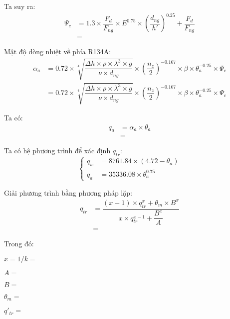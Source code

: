 Ta suy ra:
\begin{equation*}
\begin{split}
		\Psi_{c} &= 1.3\times\dfrac{F_{d}}{F_{ng}}\times E^{0.75}\times\left(\dfrac{d_{ng}}{h'}\right)^{0.25} + \dfrac{F_{d}}{F_{ng}}\\
		&=
\end{split}
\end{equation*}

Mật độ dòng nhiệt về phía R134A:
\begin{equation*}
	\begin{split}
		\alpha_{a} &= 0.72\times\sqrt[4]{\dfrac{\Delta h\times \rho\times\lambda^3\times g}{\nu\times d_{ng}}}\times\left(\dfrac{n_{z}}{2}\right)^{-0.167}\times\beta\times\theta^{-0.25}_{a}\times\Psi_{c} \\
		&=0.72\times\sqrt[4]{\dfrac{\Delta h\times \rho\times\lambda^3\times g}{\nu\times d_{ng}}}\times\left(\dfrac{n_{z}}{2}\right)^{-0.167}\times\beta\times\theta^{-0.25}_{a}\times\Psi_{c}
	\end{split}
\end{equation*}

Ta có: 
\begin{equation*}
\begin{split}
		q_{a} &= \alpha_{a}\times\theta_{a}\\
		&=
\end{split}
\end{equation*}

Ta có hệ phương trình để xác định $q_{tr}$:
\begin{equation*}
	\begin{cases}
		q_{w} &= 8761.84\times(4.72 - \theta_{a}) \\
		q_{a} &= 35336.08\times\theta_{a}^{0.75}
	\end{cases}
\end{equation*}

Giải phương trình bằng phương pháp lặp:
\begin{equation*}
	\begin{split}
		q_{tr} &= \dfrac{(x - 1)\times q_{tr}^{x} + \theta_{m}\times B^{x}}{x\times q_{tr}^{x-1} + \dfrac{B^{x}}{A}}\\
		&=
	\end{split}
\end{equation*}

Trong đó:
\begin{itemize}
\begin{multicols}{3}
	\item $x = 1/k = $
	\item $A = $
	\item $B = $
	\item $\theta_{m} = $
	\item $q'_{tr} = $
\end{multicols}
\end{itemize}

